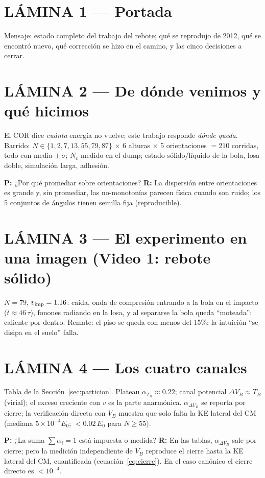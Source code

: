 \documentclass[11pt,a4paper]{article}
\begin{document}
\section*{LÁMINA 1 --- Portada}
Mensaje: estado completo del trabajo del rebote; qué se reprodujo de 2012,
qué se encontró nuevo, qué corrección se hizo en el camino, y las cinco
decisiones a cerrar.

\section*{LÁMINA 2 --- De dónde venimos y qué hicimos}
El COR dice \emph{cuánta} energía no vuelve; este trabajo responde
\emph{dónde queda}. Barrido: $N \in \{1,2,7,13,55,79,87\}$ $\times$ 6
alturas $\times$ 5 orientaciones $= 210$ corridas, todo con media
$\pm\,\sigma$; $N_c$ medido en el dump; estado sólido/líquido de la bola,
losa doble, simulación larga, adhesión.

\textbf{P:} ¿Por qué promediar sobre orientaciones? \textbf{R:} La
dispersión entre orientaciones es grande y, sin promediar, las
no-monotonías parecen física cuando son ruido; los 5 conjuntos de ángulos
tienen semilla fija (reproducible).

\section*{LÁMINA 3 --- El experimento en una imagen (Video 1: rebote sólido)}
$N=79$, $v_{\rm imp}=1.16$: caída, onda de compresión entrando a la bola en
el impacto ($t\approx46\,\tau$), fonones radiando en la losa, y al
separarse la bola queda ``moteada'': caliente por dentro. Remate: el piso
se queda con menos del 15\%; la intuición ``se disipa en el suelo'' falla.

\section*{LÁMINA 4 --- Los cuatro canales}
Tabla de la Sección~\ref{sec:particion}. Plateau $\alpha_{T_B}\approx0.22$;
canal potencial $\Delta V_B \approx T_B$ (virial); el exceso creciente con
$v$ es la parte anarmónica. $\alpha_{\Delta V_B}$ se reporta por cierre; la
verificación directa con $V_B$ muestra que solo falta la KE lateral del CM
(mediana $5\times10^{-4}E_0$; $<0.02\,E_0$ para $N\ge55$).

\textbf{P:} ¿La suma $\sum\alpha_i=1$ está impuesta o medida? \textbf{R:}
En las tablas, $\alpha_{\Delta V_B}$ sale por cierre; pero la medición
independiente de $V_B$ reproduce el cierre hasta la KE lateral del CM,
cuantificada (ecuación~\ref{eq:cierre}). En el caso canónico el cierre
directo es $<10^{-4}$.
\end{document}
